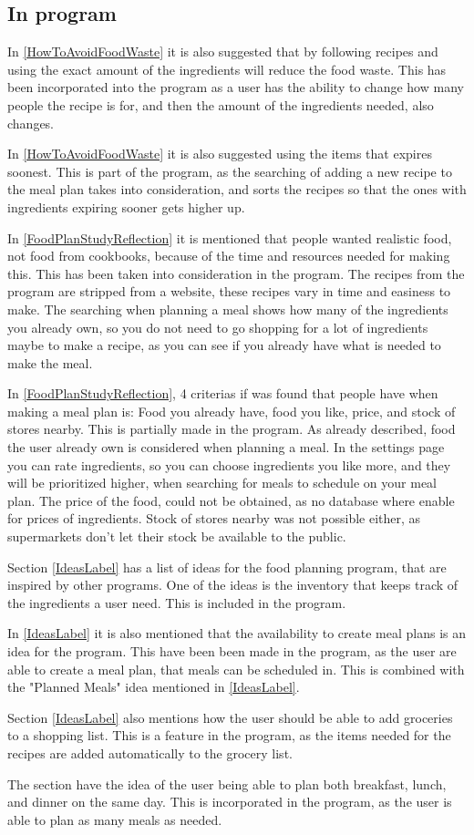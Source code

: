 \subsection{In program}

In \cref{HowToAvoidFoodWaste} it is also suggested that by following recipes and using the exact amount of the ingredients will reduce the food waste. This has been incorporated into the program as a user has the ability to change how many people the recipe is for, and then the amount of the ingredients needed, also changes.

In \cref{HowToAvoidFoodWaste} it is also suggested using the items that expires soonest. This is part of the program, as the searching of adding a new recipe to the meal plan takes into consideration, and sorts the recipes so that the ones with ingredients expiring sooner gets higher up.

In \cref{FoodPlanStudyReflection} it is mentioned that people wanted realistic food, not food from cookbooks, because of the time and resources needed for making this. This has been taken into consideration in the program. The recipes from the program are stripped from a website, these recipes vary in time and easiness to make. The searching when planning a meal shows how many of the ingredients you already own, so you do not need to go shopping for a lot of ingredients maybe to make a recipe, as you can see if you already have what is needed to make the meal.

In \cref{FoodPlanStudyReflection}, 4 criterias if was found that people have when making a meal plan is: Food you already have, food you like, price, and stock of stores nearby. This is partially made in the program. As already described, food the user already own is considered when planning a meal. In the settings page you can rate ingredients, so you can choose ingredients you like more, and they will be prioritized higher, when searching for meals to schedule on your meal plan. The price of the food, could not be obtained, as no database where enable for prices of ingredients. Stock of stores nearby was not possible either, as supermarkets don't let their stock be available to the public.

Section \ref{IdeasLabel} has a list of ideas for the food planning program, that are inspired by other programs. One of the ideas is the inventory that keeps track of the ingredients a user need. This is included in the program. 

In \cref{IdeasLabel} it is also mentioned that the availability to create meal plans is an idea for the program. This have been been made in the program, as the user are able to create a meal plan, that meals can be scheduled in. This is combined with the "Planned Meals" idea mentioned in \cref{IdeasLabel}.

Section \ref{IdeasLabel} also mentions how the user should be able to add groceries to a shopping list. This is a feature in the program, as the items needed for the recipes are added automatically to the grocery list.

The section \label{IdeasLabel} have the idea of the user being able to plan both breakfast, lunch, and dinner on the same day. This is incorporated in the program, as the user is able to plan as many meals as needed.